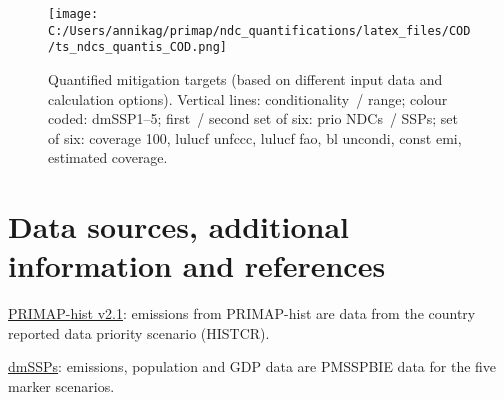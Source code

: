 \documentclass[12pt]{article}
\begin{document}
 \begin{figure}[H]
 \centering
 \texttt{[image: C:/Users/annikag/primap/ndc\_quantifications/latex\_files/COD/ts\_ndcs\_quantis\_COD.png]}
 \caption{Quantified mitigation targets (based on different input data and calculation options).
 Vertical lines: conditionality~/ range;
 colour coded: dmSSP1--5;
 first~/ second set of six: prio NDCs~/ SSPs;
 set of six: coverage 100, lulucf unfccc, lulucf fao, bl uncondi, const emi, estimated coverage.}
 \label{fig:miti}
 \end{figure}

 \newpage %
 \section{Data sources, additional information and references}
 \label{sec:dataSourcesRefs}

 \noindent \href{https://dataservices.gfz-potsdam.de/pik/showshort.php?id=escidoc:4736895}{PRIMAP-hist v2.1}: emissions from PRIMAP-hist are data from the country reported data priority scenario (HISTCR).

 \noindent \href{https://zenodo.org/record/3638137#.X2syXouxU2w}{dmSSPs}: emissions, population and GDP data are PMSSPBIE data for the five marker scenarios.
\end{document}
